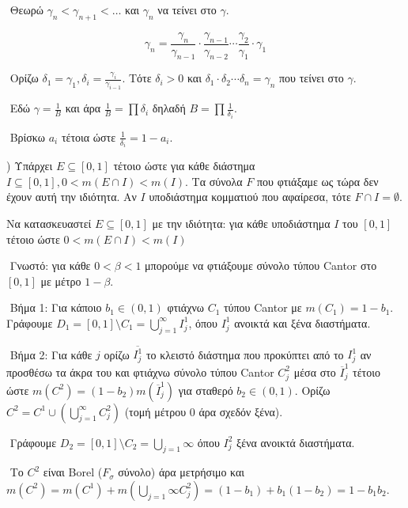 $ $\newline
Θεωρώ $γ_n < γ_{n+1} < \ldots$ και $γ_n$ να τείνει στο $γ$.

$$γ_n = \frac{γ_n}{γ_{n-1}} \cdot \frac{γ_{n-1}}{γ_{n-2}} \cdots \frac{γ_2}{γ_1} \cdot γ_1$$

$ $\newline
Ορίζω $δ_1 = γ_1, δ_i = \frac{γ_i}{γ_{i-1}}$. Τότε $δ_i > 0$ και $δ_1 \cdot δ_2 \cdots δ_n = γ_n$ που τείνει στο $γ$.

$ $\newline
Εδώ $γ = \frac{1}{B}$ και άρα $\frac{1}{B} = \prod δ_i$ δηλαδή $B = \prod \frac{1}{δ_i}$.

$ $\newline
Βρίσκω $a_i$ τέτοια ώστε $\frac{1}{δ_i} = 1-a_i$.


$ $) Υπάρχει $E\subseteq [0,1]$ τέτοιο ώστε για κάθε διάστημα $I\subseteq [0,1], 0 < m(E\cap I) < m(I)$. Τα σύνολα $F$ που φτιάξαμε ως τώρα δεν έχουν αυτή την ιδιότητα. Αν $I$ υποδιάστημα κομματιού που αφαίρεσα, τότε $F \cap I = \emptyset$.

\begin{problem} Να κατασκευαστεί $E \subseteq [0,1]$ με την ιδιότητα: για κάθε υποδιάστημα $I$ του $[0,1]$ τέτοιο ώστε $0< m(E\cap I) < m(I)$
\end{problem}

$ $\newline
Γνωστό: για κάθε $0<β<1$ μπορούμε να φτιάξουμε σύνολο τύπου {\eng Cantor} στο $[0,1]$ με μέτρο $1-β$.

$ $\newline
Βήμα 1: Για κάποιο $b_1 \in (0,1)$ φτιάχνω $C_1$ τύπου {\eng Cantor} με $m(C_1) = 1-b_1$. Γράφουμε $D_1 = [0,1]\setminus C_1 = \bigcup\limits_{j=1}^{\infty} I^1_j$, όπου $I^1_j$ ανοικτά και ξένα διαστήματα.

$ $\newline
Βήμα 2: Για κάθε $j$ ορίζω $\overline{I^1_j}$ το κλειστό διάστημα που προκύπτει από το $I^1_j$ αν προσθέσω τα άκρα του και φτιάχνω σύνολο τύπου {\eng Cantor} $C^2_j$ μέσα στο $\overline{I}^1_j$ τέτοιο ώστε $m(C^2) = (1-b_2) m(\overline{I}^1_j)$ για σταθερό $b_2 \in (0,1)$. Ορίζω $C^2 = C^1 \cup \left( \bigcup\limits_{j=1}^{\infty}C^2_j\right)$ (τομή μέτρου 0 άρα σχεδόν ξένα).

$ $\newline
Γράφουμε $D_2 = [0,1]\setminus C_2 = \bigcup\limits_{j=1}{\infty}$ όπου $I^2_j$ ξένα ανοικτά διαστήματα.

$ $\newline
Το $C^2$ είναι {\eng Borel} ($F_{\sigma}$ σύνολο) άρα μετρήσιμο και $m(C^2) = m(C^1) + m(\bigcup_{j=1}{\infty} C^2_j) = (1-b_1) + b_1(1-b_2) = 1-b_1 b_2$.

